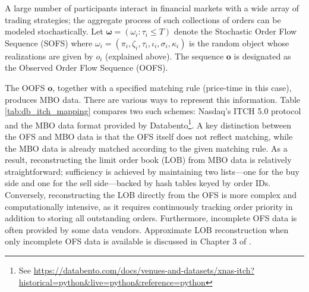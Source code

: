 \documentclass{rQUF2e}
\theoremstyle{plain}
\theoremstyle{definition}
\theoremstyle{remark}
\begin{document}
A large number of participants interact in financial markets with a wide array of trading strategies; the aggregate process of such collections of orders can be modeled stochastically. Let $\boldsymbol{\omega} = (\omega_i : \tau_i \leq T)$ denote the Stochastic Order Flow Sequence (SOFS) where $\omega_i = (\pi_i, \zeta_i, \tau_i, \iota_i, \sigma_i, \kappa_i)$ is the random object whose realizations are given by $o_i$ (explained above). The sequence $\mathbf{o}$ is designated as the Observed Order Flow Sequence (OOFS).

The OOFS $\mathbf{o}$, together with a specified matching rule (price-time in this case), produces MBO data. There are various ways to represent this information. Table \ref{tab:db_itch_mapping} compares two such schemes: Nasdaq’s ITCH 5.0 protocol \citep{nasdaq2014itch} and the MBO data format provided by Databento\footnote{See \url{https://databento.com/docs/venues-and-datasets/xnas-itch?historical=python&live=python&reference=python}}. A key distinction between the OFS and MBO data is that the OFS itself does not reflect matching, while the MBO data is already matched according to the given matching rule. As a result, reconstructing the limit order book (LOB) from MBO data is relatively straightforward; sufficiency is achieved by maintaining two lists—one for the buy side and one for the sell side—backed by hash tables keyed by order IDs. Conversely, reconstructing the LOB directly from the OFS is more complex and computationally intensive, as it requires continuously tracking order priority in addition to storing all outstanding orders. Furthermore, incomplete OFS data is often provided by some data vendors. Approximate LOB reconstruction when only incomplete OFS data is available is discussed in Chapter 3 of \citet{richards2019modelling}.
\end{document}
